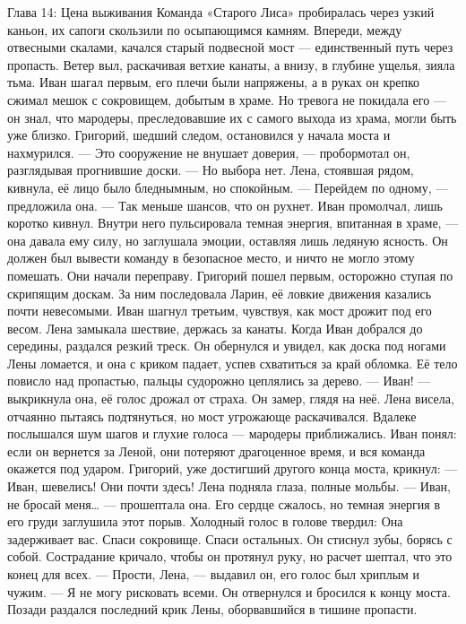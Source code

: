 \documentclass[12pt,a4paper]{book}
\begin{document}
Глава 14: Цена выживания
Команда «Старого Лиса» пробиралась через узкий каньон, их сапоги скользили по осыпающимся камням. Впереди, между отвесными скалами, качался старый подвесной мост — единственный путь через пропасть. Ветер выл, раскачивая ветхие канаты, а внизу, в глубине ущелья, зияла тьма. Иван шагал первым, его плечи были напряжены, а в руках он крепко сжимал мешок с сокровищем, добытым в храме. Но тревога не покидала его — он знал, что мародеры, преследовавшие их с самого выхода из храма, могли быть уже близко.
Григорий, шедший следом, остановился у начала моста и нахмурился.
— Это сооружение не внушает доверия, — пробормотал он, разглядывая прогнившие доски. — Но выбора нет.
Лена, стоявшая рядом, кивнула, её лицо было бледнымным, но спокойным.
— Перейдем по одному, — предложила она. — Так меньше шансов, что он рухнет.
Иван промолчал, лишь коротко кивнул. Внутри него пульсировала темная энергия, впитанная в храме, — она давала ему силу, но заглушала эмоции, оставляя лишь ледяную ясность. Он должен был вывести команду в безопасное место, и ничто не могло этому помешать.
Они начали переправу. Григорий пошел первым, осторожно ступая по скрипящим доскам. За ним последовала Ларин, её ловкие движения казались почти невесомыми. Иван шагнул третьим, чувствуя, как мост дрожит под его весом. Лена замыкала шествие, держась за канаты.
Когда Иван добрался до середины, раздался резкий треск. Он обернулся и увидел, как доска под ногами Лены ломается, и она с криком падает, успев схватиться за край обломка. Её тело повисло над пропастью, пальцы судорожно цеплялись за дерево.
— Иван! — выкрикнула она, её голос дрожал от страха.
Он замер, глядя на неё. Лена висела, отчаянно пытаясь подтянуться, но мост угрожающе раскачивался. Вдалеке послышался шум шагов и глухие голоса — мародеры приближались. Иван понял: если он вернется за Леной, они потеряют драгоценное время, и вся команда окажется под ударом.
Григорий, уже достигший другого конца моста, крикнул:
— Иван, шевелись! Они почти здесь!
Лена подняла глаза, полные мольбы.
— Иван, не бросай меня… — прошептала она.
Его сердце сжалось, но темная энергия в его груди заглушила этот порыв. Холодный голос в голове твердил: Она задерживает вас. Спаси сокровище. Спаси остальных. Он стиснул зубы, борясь с собой. Сострадание кричало, чтобы он протянул руку, но расчет шептал, что это конец для всех.
— Прости, Лена, — выдавил он, его голос был хриплым и чужим. — Я не могу рисковать всеми.
Он отвернулся и бросился к концу моста. Позади раздался последний крик Лены, оборвавшийся в тишине пропасти.
\end{document}
